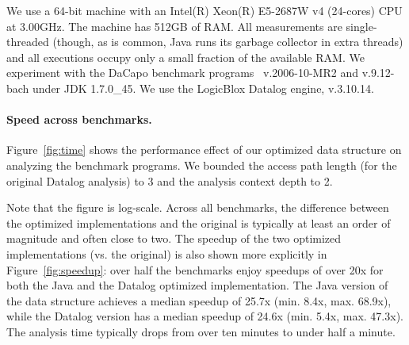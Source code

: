 
We use a 64-bit machine with an Intel(R) Xeon(R) E5-2687W v4 (24-cores) CPU
at 3.00GHz. The machine has 512GB of RAM. All measurements are single-threaded
(though, as is common, Java runs its garbage collector in extra threads) and
all executions occupy only a small fraction of the available RAM. We experiment
with the DaCapo benchmark programs~\cite{dacapo:paper} v.2006-10-MR2 and
v.9.12-bach under JDK 1.7.0\_45.  We use the LogicBlox Datalog engine,
v.3.10.14.

\paragraph{Speed across benchmarks.}

Figure~\ref{fig:time} shows the performance effect of our optimized
data structure on analyzing the benchmark programs. We bounded the
access path length (for the original Datalog analysis) to 3 and the
analysis context depth to 2.


Note that the figure is log-scale. Across all benchmarks, the
difference between the optimized implementations and the original is
typically at least an order of magnitude and often close to two.  The
speedup of the two optimized implementations (vs. the original) is
also shown more explicitly in Figure~\ref{fig:speedup}: over half the
benchmarks enjoy speedups of over 20x for both the Java and the Datalog
optimized implementation. The Java version of the data structure achieves
a median speedup of 25.7x (min. 8.4x, max. 68.9x), while the Datalog
version has a median speedup of 24.6x (min. 5.4x, max. 47.3x). 
The analysis time typically drops from over ten minutes to under half a minute. 

